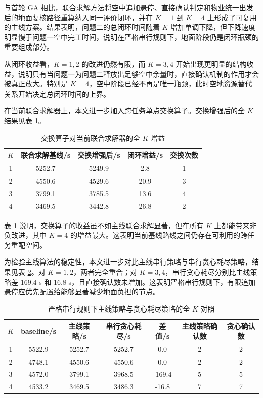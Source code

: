 \documentclass[12pt]{article}
\begin{document}
与首轮 GA 相比，联合求解方法将空中追加悬停、直接确认判定和物业统一出发后的地面复核路径重算纳入同一评价闭环，并在 $K=1$ 到 $K=4$ 上形成了可复用的主线方案。结果表明，问题二的总闭环时间随着 $K$ 增加单调下降，但下降速度明显慢于问题一空中完工时间，说明在严格串行规则下，地面阶段仍是闭环瓶颈的重要组成部分。

从闭环收益看，$K=1,2$ 的改进仍然有限，而 $K=3,4$ 开始出现更明显的结构收益，说明只有当问题一为问题二释放出足够空中余量时，直接确认机制的作用才会被真正放大。特别是 $K=4$，空中阶段已经不再是唯一瓶颈，此时空地资源替代关系开始决定总闭环时间的上界。

在当前联合求解器上，本文进一步加入跨任务单点交换算子。交换增强后的全 $K$ 结果见表 \ref{tab:problem2-swap-fullk}。

\begin{table}[H]
\centering
\caption{交换算子对当前联合求解器的全 $K$ 增益}
\label{tab:problem2-swap-fullk}
\begin{tabular}{ccccc}
\toprule
$K$ & 联合求解基线/s & 交换增强后/s & 闭环增益/s & 交换次数 \\
\midrule
1 & 5252.7 & 5249.9 & 2.8 & 1 \\
2 & 4550.6 & 4529.6 & 20.9 & 3 \\
3 & 3799.1 & 3785.5 & 13.6 & 4 \\
4 & 3469.5 & 3442.8 & 26.8 & 2 \\
\bottomrule
\end{tabular}
\end{table}

表 \ref{tab:problem2-swap-fullk} 说明，交换算子的收益虽不如主线联合求解显著，但在所有 $K$ 上都能带来非负改进，其中 $K=4$ 的增益最大。这表明当前基线路线之间仍存在可利用的跨任务重配空间。

为检验主线算法的稳定性，本文进一步对比主线串行策略与串行贪心耗尽策略，结果见表 \ref{tab:problem2-f-light-fullk}。对 $K=1,2$，两者完全重合；对 $K=3,4$，串行贪心耗尽分别比主线策略差 169.4 s 和 16.8 s，且直接确认数未增加。这表明严格串行规则下，有限追加悬停应优先配置给能够显著减少地面负担的节点。

\begin{table}[H]
\centering
\caption{严格串行规则下主线策略与贪心耗尽策略的全 $K$ 对照}
\label{tab:problem2-f-light-fullk}
\begin{tabular}{ccccccc}
\toprule
$K$ & baseline/s & 主线策略/s & 串行贪心耗尽/s & 差值/s & 主线策略确认数 & 贪心确认数 \\
\midrule
1 & 5522.9 & 5252.7 & 5252.7 & 0.0 & 2 & 2 \\
2 & 4748.1 & 4550.6 & 4550.6 & 0.0 & 2 & 2 \\
3 & 4572.0 & 3799.1 & 3968.5 & -169.4 & 5 & 5 \\
4 & 4533.2 & 3469.5 & 3486.3 & -16.8 & 7 & 7 \\
\bottomrule
\end{tabular}
\end{table}
\end{document}
